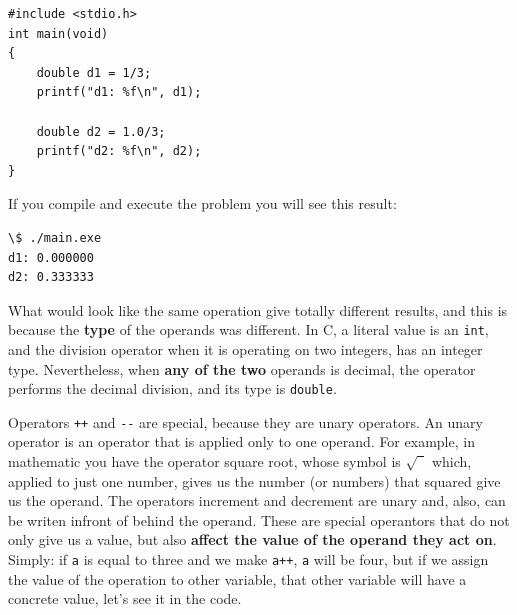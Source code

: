 \documentclass[a4paper]{article}
\begin{document}
\noindent
\begin{minipage}[H]{\linewidth}
\mbox{}
\begin{lstlisting}[style=C, caption={Integer division vs decimal division},
label={lst:decimalvsintergerDivision}]
#include <stdio.h>
int main(void)
{
    double d1 = 1/3;
    printf("d1: %f\n", d1);

    double d2 = 1.0/3;
    printf("d2: %f\n", d2);
}
\end{lstlisting}
\end{minipage}

If you compile and execute the problem you will see this result:

\noindent
\begin{minipage}[H]{\linewidth}
\mbox{}
\begin{lstlisting}[style=terminalStyle]
\$ ./main.exe
d1: 0.000000
d2: 0.333333
\end{lstlisting}
\end{minipage}

What would look like the same operation give totally different results, and this
is because the \textbf{type} of the operands was different. In C, a literal
value is an \texttt{int}, and the division operator when it is operating on two
integers, has an integer type. Nevertheless, when \textbf{any of the two}
operands is decimal, the operator performs the decimal division, and its type
is \texttt{double}.


Operators \verb!++! and \verb!--! are special, because they are unary operators.
An unary operator is an operator that is applied only to one operand. For
example, in mathematic you have the operator square root, whose symbol is
$\sqrt{\phantom{2}}$ which, applied to just one number, gives us the number
(or numbers) that squared give us the operand. The operators increment and
decrement are unary and, also, can be writen infront of behind the operand.
These are special operantors that do not only give us a value, but also
\textbf{affect the value of the operand they act on}. Simply: if \verb!a! is
equal to three and we make \verb!a++!, \verb!a! will be four, but if we assign
the value of the operation to other variable, that other variable will have
a concrete value, let's see it in the code.
\end{document}
